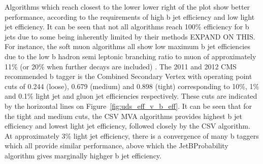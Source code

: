 Algorithms which reach closest to the lower lower right of the plot show better performance, according to the
requirements of high b jet efficiency and low light jet efficiency. It can be seen that not all algorithms
reach 100\% efficiency for b jets due to some being inherently limited by their methods EXPAND ON THIS. For
instance, the soft muon algorithms all show low maximum b jet efficiencies due to the low b hadron semi
leptonic branching ratio to muon of approximately 11\% (or 20\% when further decays are included)
\cite{btagging_in_CMS}. The 2011 and 2012 CMS recommended b tagger is the Combined Secondary Vertex with
operating point cuts of 0.244 (loose), 0.679 (medium) and 0.898 (tight) corresponding to 10\%, 1\% and 0.1\%
light jet and gluon jet efficiencies respectively. These cuts are indicated by the horizontal lines on
Figure~\ref{fig:uds_eff_v_b_eff}. It can be seen that for the tight and medium cuts, the CSV MVA algorithms
provides highest b jet efficiency and lowest light jet efficiency, followed closely by the CSV algorithm. At
approximately 3\% light jet efficiency, there is a convergence of many b taggers which all provide similar
performance, above which the JetBProbability algorithm gives marginally highger b jet efficiency.

